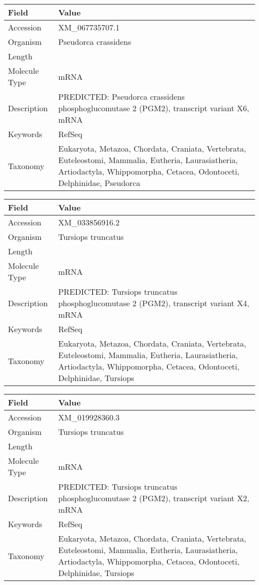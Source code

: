 \documentclass[10pt]{article}
\begin{document}
\vspace{1em}
{\footnotesize
\begin{longtable}{>{\raggedright\arraybackslash}p{4.5cm} >{\raggedright\arraybackslash}p{11.5cm}}
\textbf{Field} & \textbf{Value} \\
\hline
Accession & XM\_067735707.1 \\
Organism & Pseudorca crassidens \\
Length & 12448 \\
Molecule Type & mRNA \\
Description & PREDICTED: Pseudorca crassidens phosphoglucomutase 2 (PGM2), transcript variant X6, mRNA \\
Keywords & RefSeq \\
Taxonomy & Eukaryota, Metazoa, Chordata, Craniata, Vertebrata, Euteleostomi, Mammalia, Eutheria, Laurasiatheria, Artiodactyla, Whippomorpha, Cetacea, Odontoceti, Delphinidae, Pseudorca \\
\end{longtable}
}

\vspace{1em}
{\footnotesize
\begin{longtable}{>{\raggedright\arraybackslash}p{4.5cm} >{\raggedright\arraybackslash}p{11.5cm}}
\textbf{Field} & \textbf{Value} \\
\hline
Accession & XM\_033856916.2 \\
Organism & Tursiops truncatus \\
Length & 3463 \\
Molecule Type & mRNA \\
Description & PREDICTED: Tursiops truncatus phosphoglucomutase 2 (PGM2), transcript variant X4, mRNA \\
Keywords & RefSeq \\
Taxonomy & Eukaryota, Metazoa, Chordata, Craniata, Vertebrata, Euteleostomi, Mammalia, Eutheria, Laurasiatheria, Artiodactyla, Whippomorpha, Cetacea, Odontoceti, Delphinidae, Tursiops \\
\end{longtable}
}

\vspace{1em}
{\footnotesize
\begin{longtable}{>{\raggedright\arraybackslash}p{4.5cm} >{\raggedright\arraybackslash}p{11.5cm}}
\textbf{Field} & \textbf{Value} \\
\hline
Accession & XM\_019928360.3 \\
Organism & Tursiops truncatus \\
Length & 3473 \\
Molecule Type & mRNA \\
Description & PREDICTED: Tursiops truncatus phosphoglucomutase 2 (PGM2), transcript variant X2, mRNA \\
Keywords & RefSeq \\
Taxonomy & Eukaryota, Metazoa, Chordata, Craniata, Vertebrata, Euteleostomi, Mammalia, Eutheria, Laurasiatheria, Artiodactyla, Whippomorpha, Cetacea, Odontoceti, Delphinidae, Tursiops \\
\end{longtable}
}
\end{document}
